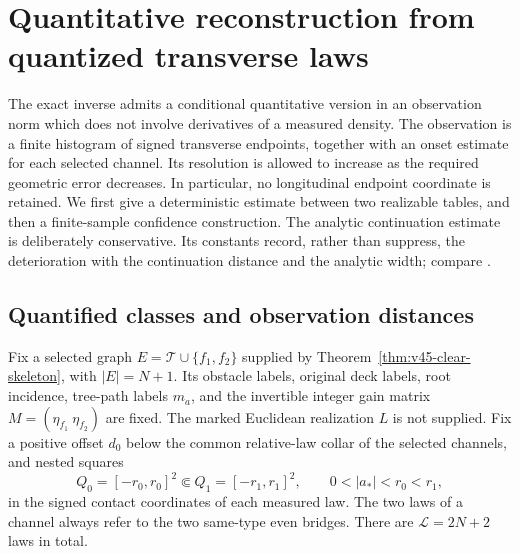 \section{Quantitative reconstruction from quantized transverse laws}
\label{sec:v46-quantized-stability}

The exact inverse admits a conditional quantitative version in an observation
norm which does not involve derivatives of a measured density.  The observation
is a finite histogram of signed transverse endpoints, together with an onset
estimate for each selected channel.  Its resolution is allowed to increase as
the required geometric error decreases.  In particular, no longitudinal
endpoint coordinate is retained.  We first give a deterministic estimate
between two realizable tables, and then a finite-sample confidence construction.
The analytic continuation estimate is deliberately conservative.  Its constants
record, rather than suppress, the deterioration with the continuation distance
and the analytic width; compare \cite{Trefethen2020}.

\subsection{Quantified classes and observation distances}

Fix a selected graph $E=\mathcal T\cup\{f_1,f_2\}$ supplied by
Theorem~\ref{thm:v45-clear-skeleton}, with $|E|=N+1$.  Its obstacle labels,
original deck labels, root incidence, tree-path labels $m_a$, and the invertible
integer gain matrix $M=(\eta_{f_1}\ \eta_{f_2})$ are fixed.  The marked
Euclidean realization $L$ is not supplied.  Fix a positive offset $d_0$ below the common relative-law collar of the
selected channels, and
nested squares
\[
 Q_0=[-r_0,r_0]^2\Subset Q_1=[-r_1,r_1]^2,
 \qquad 0<|a_*|<r_0<r_1,
\]
in the signed contact coordinates of each measured law.  The two laws of a
channel always refer to the two same-type even bridges.  There are
$\mathcal L=2N+2$ laws in total.

